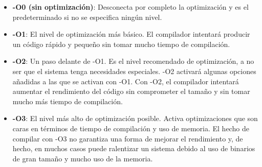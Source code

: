 \documentclass{homework}
\begin{document}
    \begin{itemize}
        \item \textbf{-O0 (sin optimización)}: Desconecta por completo la optimización y es el predeterminado si 
        no se especifica ningún nivel.
        \item \textbf{-O1}: El nivel de optimización más básico. El compilador intentará producir un código rápido
        y pequeño sin tomar mucho tiempo de compilación. 
        \item \textbf{-O2}: Un paso delante de -O1. Es el nivel recomendado de optimización, a no ser que el sistema
        tenga necesidades especiales. -O2 activará algunas opciones añadidas a las que se activan con -O1. 
        Con -O2, el compilador intentará aumentar el rendimiento del código sin comprometer el tamaño y sin tomar 
        mucho más tiempo de compilación.
        \item \textbf{-O3}:  El nivel más alto de optimización posible. Activa optimizaciones que son caras en términos 
        de tiempo de compilación y uso de memoria. El hecho de compilar con -O3 no garantiza una forma de mejorar el 
        rendimiento y, de hecho, en muchos casos puede ralentizar un sistema debido al uso de binarios de gran tamaño y 
        mucho uso de la memoria.
    \end{itemize} 
    




    

    
\end{document}
